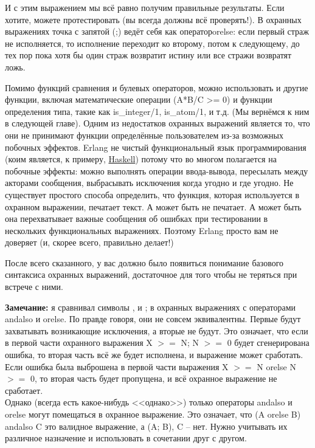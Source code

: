 \documentclass[a4paper,12pt]{report}
\newcommand{\ops}{\colorbox{lgreen}}
\begin{document}
И с этим выражением мы всё равно получим правильные результаты. Если хотите, можете протестировать (вы всегда должны всё проверять!). В охранных выражениях точка с запятой (\ops{;}) ведёт себя как оператор\ops{orelse}: если первый страж не исполняется, то исполнение переходит ко второму, потом к следующему, до тех пор пока хотя бы один страж возвратит истину или все стражи возвратят ложь.

Помимо функций сравнения и булевых операторов, можно использовать и другие функции, включая математические операции (\ops{A*B\//C >= 0}) и функции определения типа, такие как \ops{is\_integer/1}, \ops{is\_atom/1}, и т.д. (Мы вернёмся к ним в следующей главе). Одним из недостатков охранных выражений является то, что они не принимают функции определённые пользователем из\--за возможных побочных эффектов. Erlang не чистый функциональный язык программирования (коим является, к примеру, \href{http://learnyouahaskell.com}{Haskell}) потому что во многом полагается на побочные эффекты: можно выполнять операции ввода\--вывода, пересылать между акторами сообщения, выбрасывать исключения когда угодно и где угодно. Не существует простого способа определить, что функция, которая используется в охранном выражении, печатает текст. А может быть не печатает. А может быть она перехватывает важные сообщения об ошибках при тестировании в нескольких функциональных выражениях. Поэтому Erlang просто вам не доверяет (и, скорее всего, правильно делает!)

    После всего сказанного, у вас должно было появиться понимание базового синтаксиса охранных выражений, достаточное для того чтобы не теряться при встрече с ними.\\
\colorbox{lgray}
{
    \begin{minipage}{\linewidth}
        \textbf{Замечание:} я сравнивал символы \ops{,} и \ops{;} в охранных выражениях с операторами \ops{andalso} и \ops{orelse}. По правде говоря, они не совсем эквивалентны. Первые будут захватывать возникающие исключения, а вторые не будут. Это означает, что если в первой части охранного выражения \ops{X $>=$ N; N $>=$ 0} будет сгенерирована ошибка, то вторая часть всё же будет исполнена, и выражение может сработать. Если ошибка была выброшена в первой части выражения \ops{X $>=$ N orelse N $>=$ 0}, то вторая часть будет пропущена, и всё охранное выражение не сработает.\\ 
        Однако (всегда есть какое\--нибудь <<однако>>) только операторы \ops{andalso} и \ops{orelse} могут помещаться в охранное выражение. Это означает, что \ops{(A orelse B) andalso C} это валидное выражение, а \ops{(A; B), C} \--- нет. Нужно учитывать их различное назначение и использовать в сочетании друг с другом.
    \end{minipage}
}
\end{document}
